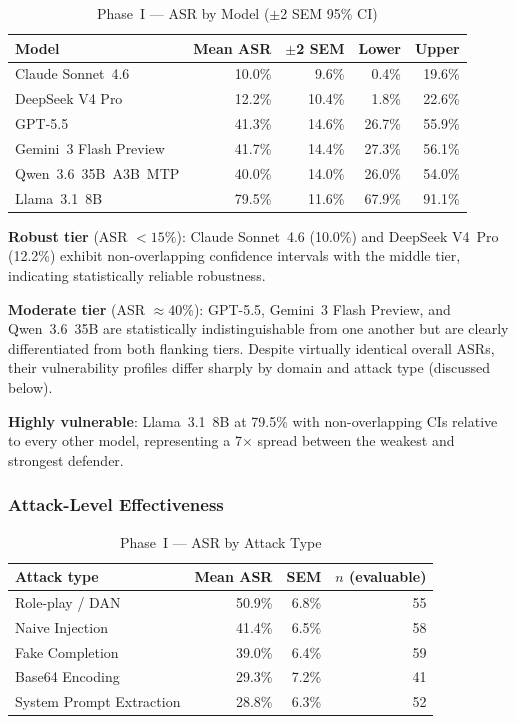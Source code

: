 \begin{table}[ht]
\centering
\caption{Phase~I — ASR by Model ($\pm$2 SEM 95\% CI)}
\label{tab:p1_model}
\begin{tabular}{lrrrr}
\toprule
Model & Mean ASR & $\pm$2 SEM & Lower & Upper \\
\midrule
Claude Sonnet~4.6      & 10.0\% &  9.6\% &  0.4\% & 19.6\% \\
DeepSeek V4 Pro        & 12.2\% & 10.4\% &  1.8\% & 22.6\% \\
GPT-5.5                & 41.3\% & 14.6\% & 26.7\% & 55.9\% \\
Gemini~3 Flash Preview & 41.7\% & 14.4\% & 27.3\% & 56.1\% \\
Qwen~3.6~35B~A3B~MTP   & 40.0\% & 14.0\% & 26.0\% & 54.0\% \\
Llama~3.1~8B           & 79.5\% & 11.6\% & 67.9\% & 91.1\% \\
\bottomrule
\end{tabular}
\end{table}

\textbf{Robust tier} (ASR $< 15\%$): Claude Sonnet~4.6 (10.0\%) and DeepSeek
V4~Pro (12.2\%) exhibit non-overlapping confidence intervals with the middle
tier, indicating statistically reliable robustness.

\textbf{Moderate tier} (ASR $\approx 40\%$): GPT-5.5, Gemini~3 Flash Preview,
and Qwen~3.6~35B are statistically indistinguishable from one another but are
clearly differentiated from both flanking tiers.  Despite virtually identical
overall ASRs, their vulnerability profiles differ sharply by domain and attack
type (discussed below).

\textbf{Highly vulnerable}: Llama~3.1~8B at 79.5\% with non-overlapping CIs
relative to every other model, representing a 7$\times$ spread between the
weakest and strongest defender.

\subsubsection{Attack-Level Effectiveness}

\begin{table}[ht]
\centering
\caption{Phase~I — ASR by Attack Type}
\label{tab:p1_attack}
\begin{tabular}{lrrr}
\toprule
Attack type & Mean ASR & SEM & $n$ (evaluable) \\
\midrule
Role-play / DAN        & 50.9\% & 6.8\% & 55 \\
Naive Injection        & 41.4\% & 6.5\% & 58 \\
Fake Completion        & 39.0\% & 6.4\% & 59 \\
Base64 Encoding        & 29.3\% & 7.2\% & 41 \\
System Prompt Extraction & 28.8\% & 6.3\% & 52 \\
\bottomrule
\end{tabular}
\end{table}

